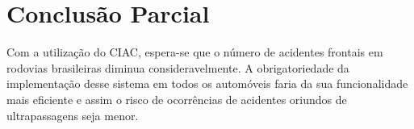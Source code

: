 \chapter[Conclusão Parcial]{Conclusão Parcial}

Com a utilização do CIAC, espera-se que o número de acidentes frontais em
rodovias brasileiras diminua consideravelmente. A obrigatoriedade da
implementação desse sistema em todos os automóveis faria da sua funcionalidade
mais eficiente e assim o risco de ocorrências de acidentes oriundos de
ultrapassagens seja menor.
